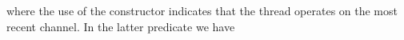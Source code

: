 \begin{AgdaAlign}
\begin{code}%
%
\>[2]\AgdaSpace{}%
\AgdaSymbol{:}\AgdaSpace{}%
\AgdaSpace{}%
\AgdaSpace{}%
\AgdaSymbol{\}}\AgdaSpace{}%
\AgdaSymbol{(}\AgdaSpace{}%
\AgdaSymbol{:}\AgdaSpace{}%
\AgdaSpace{}%
\AgdaSpace{}%
\AgdaInductiveConstructor{[]}\AgdaSpace{}%
\AgdaOperator{\AgdaDatatype{+}}\AgdaSpace{}%
\AgdaSymbol{)}\AgdaSpace{}%
\AgdaSpace{}%
\AgdaSpace{}%
\AgdaSymbol{(}\AgdaSpace{}%
\AgdaSymbol{(}\AgdaSpace{}%
\AgdaSpace{}%
\AgdaOperator{\AgdaInductiveConstructor{<}}\AgdaSpace{}%
\AgdaSpace{}%
\AgdaSpace{}%
\AgdaSymbol{))}\<%
\end{code}
where the use of the constructor \AgdaInductiveConstructor{<} indicates that the
thread operates on the most recent channel. In the latter predicate we have


\end{AgdaAlign}
